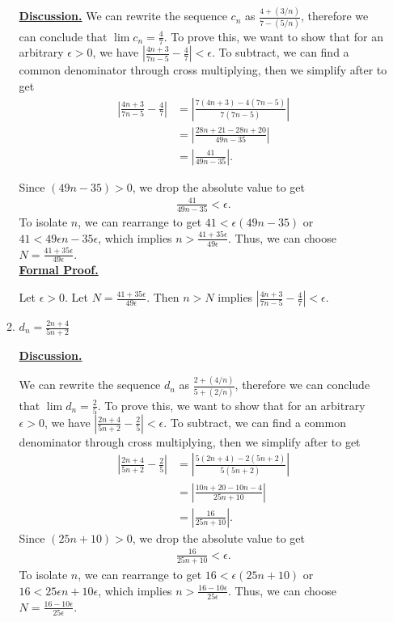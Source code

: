 \documentclass [10pt]{article}
\newcommand{\jg}[1]{{\color{blue} #1}}
\begin{document}
\begin{enumerate}
\begin{enumerate}
\jg{
\textbf{\underline{Discussion.}}
We can rewrite the sequence $c_n$ as $\frac{4 + (3/n)}{7 - (5/n)}$, therefore we can conclude that $\lim c_n = \frac{4}{7}$. To prove this, we want to show that for an arbitrary $\epsilon > 0$, we have $|\frac{4n+3}{7n-5} - \frac{4}{7}| < \epsilon$. To subtract, we can find a common denominator through cross multiplying, then we simplify after to get
\begin{align*}
    \left|\frac{4n+3}{7n-5}-\frac{4}{7}\right| 
    &= \left|\frac{7(4n+3)-4(7n-5)}{7(7n-5)}\right| \\
    &= \left|\frac{28n+21-28n+20}{49n-35}\right| \\
    &= \left|\frac{41}{49n-35}\right|.
\end{align*}

Since $(49n-35) > 0$, we drop the absolute value to get
\begin{align*}
    \frac{41}{49n-35}<\epsilon.
\end{align*}
To isolate $n$, we can rearrange to get $41 < \epsilon(49n-35)$ or $41 < 49\epsilon n-35\epsilon$, which implies $n > \frac{41+35\epsilon}{49\epsilon}$. Thus, we can choose $N = \frac{41+35\epsilon}{49\epsilon}$. \\

\textbf{\underline{Formal Proof.}}

Let $\epsilon > 0$. Let $N = \frac{41+35\epsilon}{49\epsilon}$. Then $n > N$ implies $|\frac{4n+3}{7n-5} - \frac{4}{7}| < \epsilon$. 
}
\item $d_n = \frac{2n+4}{5n+2}$

\jg{
\textbf{\underline{Discussion.}}

We can rewrite the sequence $d_n$ as $\frac{2 + (4/n)}{5 + (2/n)}$, therefore we can conclude that $\lim d_n = \frac{2}{5}$. To prove this, we want to show that for an arbitrary $\epsilon > 0$, we have $|\frac{2n+4}{5n+2} - \frac{2}{5}| < \epsilon$. To subtract, we can find a common denominator through cross multiplying, then we simplify after to get
\begin{align*}
    \left|\frac{2n+4}{5n+2}-\frac{2}{5}\right| 
    &= \left|\frac{5(2n+4)-2(5n+2)}{5(5n+2)}\right| \\
    &= \left|\frac{10n+20-10n-4}{25n+10}\right| \\
    &= \left|\frac{16}{25n+10}\right|.
\end{align*}
Since $(25n+10) > 0$, we drop the absolute value to get
\begin{align*}
    \frac{16}{25n+10}<\epsilon.
\end{align*}
To isolate $n$, we can rearrange to get $16 < \epsilon(25n+10)$ or $16 < 25\epsilon n+10\epsilon$, which implies $n > \frac{16-10\epsilon}{25\epsilon}$. Thus, we can choose $N = \frac{16-10\epsilon}{25\epsilon}$. \\

}
\end{enumerate}
\end{enumerate}
\end{document}
